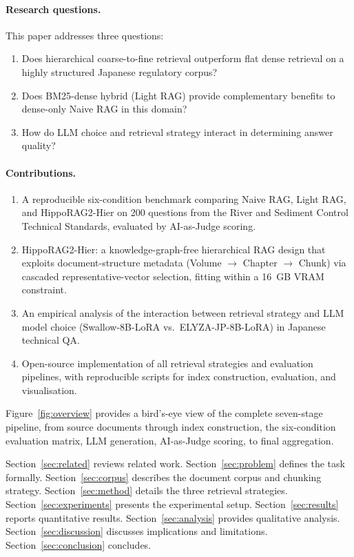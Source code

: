 \documentclass[twocolumn]{article}
\begin{document}
\paragraph{Research questions.}
This paper addresses three questions:
\begin{enumerate}
  \item Does hierarchical coarse-to-fine retrieval outperform flat dense retrieval
        on a highly structured Japanese regulatory corpus?
  \item Does BM25-dense hybrid (Light RAG) provide complementary benefits to
        dense-only Naive RAG in this domain?
  \item How do LLM choice and retrieval strategy interact in determining
        answer quality?
\end{enumerate}

\paragraph{Contributions.}
\begin{enumerate}
  \item A reproducible six-condition benchmark comparing Naive RAG, Light RAG,
        and HippoRAG2-Hier on 200 questions from the River and Sediment Control
        Technical Standards, evaluated by AI-as-Judge scoring.
  \item HippoRAG2-Hier: a knowledge-graph-free hierarchical RAG design that
        exploits document-structure metadata (Volume $\to$ Chapter $\to$ Chunk)
        via cascaded representative-vector selection, fitting within a 16~GB
        VRAM constraint.
  \item An empirical analysis of the interaction between retrieval strategy and
        LLM model choice (Swallow-8B-LoRA vs.\ ELYZA-JP-8B-LoRA) in Japanese
        technical QA.
  \item Open-source implementation of all retrieval strategies and evaluation
        pipelines, with reproducible scripts for index construction, evaluation,
        and visualisation.
\end{enumerate}

Figure~\ref{fig:overview} provides a bird's-eye view of the complete
seven-stage pipeline, from source documents through index construction,
the six-condition evaluation matrix, LLM generation, AI-as-Judge scoring,
to final aggregation.

Section~\ref{sec:related} reviews related work.
Section~\ref{sec:problem} defines the task formally.
Section~\ref{sec:corpus} describes the document corpus and chunking strategy.
Section~\ref{sec:method} details the three retrieval strategies.
Section~\ref{sec:experiments} presents the experimental setup.
Section~\ref{sec:results} reports quantitative results.
Section~\ref{sec:analysis} provides qualitative analysis.
Section~\ref{sec:discussion} discusses implications and limitations.
Section~\ref{sec:conclusion} concludes.
\end{document}
